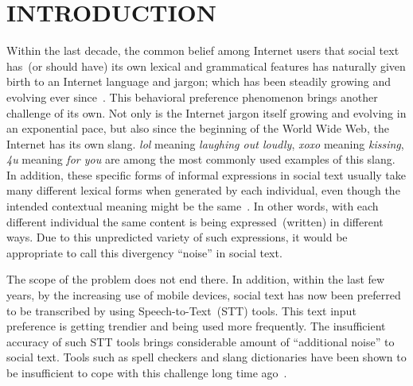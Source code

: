 \documentclass[a4paper,onesided,12pt]{report}
\begin{document}
\begin{abbreviations}
\sym{}{}
\sym{}{}
\sym{}{}
\sym{}{}
\end{abbreviations}


\chapter{INTRODUCTION}
\label{chapter:introduction}
Within the last decade, the common belief among Internet users that social text has~(or should have) its own lexical and grammatical features has naturally given birth to an Internet language and jargon; which has been steadily growing and evolving ever since~\cite{Choudhury:2007:IMS:1326044.1326048, eisenstein2013bad}. This behavioral preference phenomenon brings another challenge of its own. Not only is the Internet jargon itself growing and evolving in an exponential pace, but also since the beginning of the World Wide Web, the Internet has its own slang. \textit{lol} meaning \textit{laughing out loudly},  \textit{xoxo} meaning \textit{kissing}, \textit{4u} meaning \textit{for you} are among the most commonly used examples of this slang. In addition, these specific forms of informal expressions in social text usually take many different lexical forms when generated by each individual, even though the intended contextual meaning might be the same~\cite{eisenstein2013bad}. In other words, with each different individual the same content is being expressed~(written) in different ways. Due to this unpredicted variety of such expressions, it would be appropriate to call this divergency ``noise'' in social text.

The scope of the problem does not end there. In addition, within the last few years, by the increasing use of mobile devices, social text has now been preferred to be transcribed by using Speech-to-Text~(STT) tools. This text input preference is getting trendier and being used more frequently. The insufficient accuracy of such STT tools brings considerable amount of ``additional noise'' to social text. Tools such as spell checkers and slang dictionaries have been shown to be insufficient to cope with this challenge long time ago~\cite{sproat2001normalization}.
\end{document}
